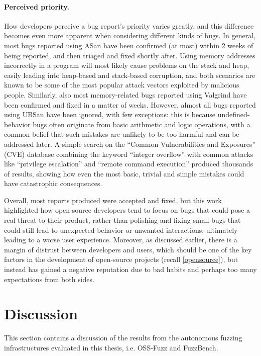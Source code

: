 \paragraph{Perceived priority.} How developers perceive a bug report's priority varies greatly, and this difference becomes even more apparent when considering different kinds of bugs. In general, most bugs reported using ASan have been confirmed (at most) within 2 weeks of being reported, and then triaged and fixed shortly after. Using memory addresses incorrectly in a program will most likely cause problems on the stack and heap, easily leading into heap-based and stack-based corruption, and both scenarios are known to be some of the most popular attack vectors exploited by malicious people. Similarly, also most memory-related bugs reported using Valgrind have been confirmed and fixed in a matter of weeks. However, almost all bugs reported using UBSan have been ignored, with few exceptions: this is because undefined-behavior bugs often originate from basic arithmetic and logic operations, with a common belief that such mistakes are unlikely to be too harmful and can be addressed later. A simple search on the ``Common Vulnerabilities and Exposures'' (CVE) database \cite{cve} combining the keyword ``integer overflow'' with common attacks like ``privilege escalation'' and ``remote command execution'' produced thousands of results, showing how even the most basic, trivial and simple mistakes could have catastrophic consequences.

Overall, most reports produced were accepted and fixed, but this work highlighted how open-source developers tend to focus on bugs that could pose a real threat to their product, rather than polishing and fixing small bugs that could still lead to unexpected behavior or unwanted interactions, ultimately leading to a worse user experience. Moreover, as discussed earlier, there is a margin of distrust between developers and users, which should be one of the key factors in the development of open-source projects (recall \ref{opensource}), but instead has gained a negative reputation due to bad habits and perhaps too many expectations from both sides.












\newpage
\section{Discussion}
This section contains a discussion of the results from the autonomous fuzzing infrastructures evaluated in this thesis, i.e. OSS-Fuzz and FuzzBench.

